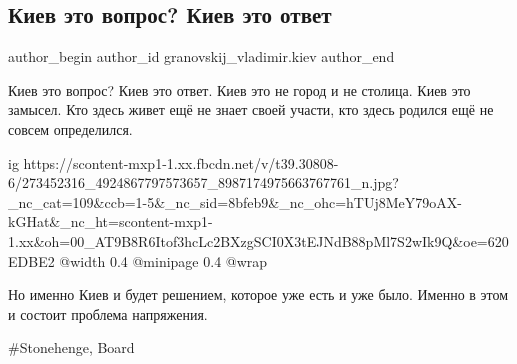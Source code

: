  
 
 
 
 
 
\subsection{Киев это вопрос? Киев это ответ}
\label{sec:04_02_2022.fb.granovskij_vladimir.kiev.1.kiev_vopros_otvet}
 
\ifcmt
 author_begin
   author_id granovskij_vladimir.kiev
 author_end
\fi

Киев это вопрос? Киев это ответ. Киев это не город и не столица. Киев это
замысел. Кто здесь живет ещё не знает своей участи, кто здесь родился ещё не
совсем определился.

\ifcmt
  ig https://scontent-mxp1-1.xx.fbcdn.net/v/t39.30808-6/273452316_4924867797573657_8987174975663767761_n.jpg?_nc_cat=109&ccb=1-5&_nc_sid=8bfeb9&_nc_ohc=hTUj8MeY79oAX-kGHat&_nc_ht=scontent-mxp1-1.xx&oh=00_AT9B8R6Itof3hcLc2BXzgSCI0X3tEJNdB88pMl7S2wIk9Q&oe=620EDBE2
  @width 0.4
  @minipage 0.4
  @wrap \parpic[r]
\fi

Но именно Киев и будет решением, которое уже есть и уже было. Именно в этом и
состоит проблема напряжения. 

\#Stonehenge, Board
